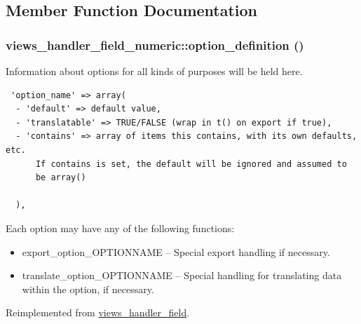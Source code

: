 \subsection{Member Function Documentation}
\hypertarget{classviews__handler__field__numeric_ab74a55c8b3c564ee995e210a503947b}{
\subsubsection[{option\_\-definition}]{\setlength{\rightskip}{0pt plus 5cm}views\_\-handler\_\-field\_\-numeric::option\_\-definition ()}}
\label{classviews__handler__field__numeric_ab74a55c8b3c564ee995e210a503947b}


Information about options for all kinds of purposes will be held here. 

\begin{Code}\begin{verbatim} 'option_name' => array(
  - 'default' => default value,
  - 'translatable' => TRUE/FALSE (wrap in t() on export if true),
  - 'contains' => array of items this contains, with its own defaults, etc.
      If contains is set, the default will be ignored and assumed to
      be array()

  ),
\end{verbatim}
\end{Code}

 Each option may have any of the following functions:\begin{itemize}
\item export\_\-option\_\-OPTIONNAME -- Special export handling if necessary.\item translate\_\-option\_\-OPTIONNAME -- Special handling for translating data within the option, if necessary. \end{itemize}


Reimplemented from \hyperlink{classviews__handler__field_64c69a8a3697603f8283405071c25b76}{views\_\-handler\_\-field}.

